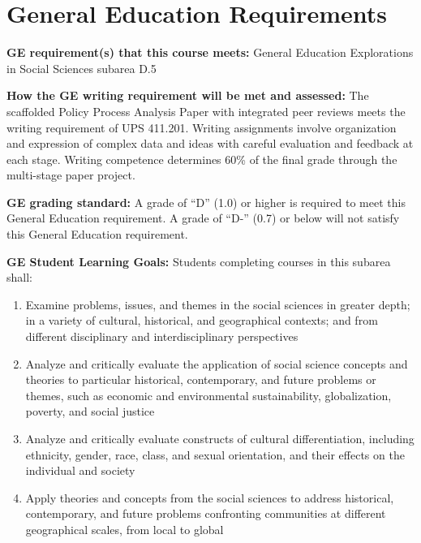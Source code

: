 \documentclass[12pt]{article}     %
\begin{document}
\section{General Education Requirements}
\noindent \textbf{GE requirement(s) that this course meets:} General Education Explorations in Social Sciences subarea D.5

\vspace{0.5em}
\noindent \textbf{How the GE writing requirement will be met and assessed:}
The scaffolded Policy Process Analysis Paper with integrated peer reviews meets the writing requirement of UPS 411.201. Writing assignments involve organization and expression of complex data and ideas with careful evaluation and feedback at each stage. Writing competence determines 60\% of the final grade through the multi-stage paper project.

\vspace{0.5em}
\noindent \textbf{GE grading standard:}
A grade of ``D'' (1.0) or higher is required to meet this General Education requirement. A grade of ``D-'' (0.7) or below will not satisfy this General Education requirement.

\vspace{0.5em}
\noindent \textbf{GE Student Learning Goals:}
Students completing courses in this subarea shall:
\begin{enumerate}
\item Examine problems, issues, and themes in the social sciences in greater depth; in a variety of cultural, historical, and geographical contexts; and from different disciplinary and interdisciplinary perspectives
\item Analyze and critically evaluate the application of social science concepts and theories to particular historical, contemporary, and future problems or themes, such as economic and environmental sustainability, globalization, poverty, and social justice
\item Analyze and critically evaluate constructs of cultural differentiation, including ethnicity, gender, race, class, and sexual orientation, and their effects on the individual and society
\item Apply theories and concepts from the social sciences to address historical, contemporary, and future problems confronting communities at different geographical scales, from local to global
\end{enumerate}

\end{document}
